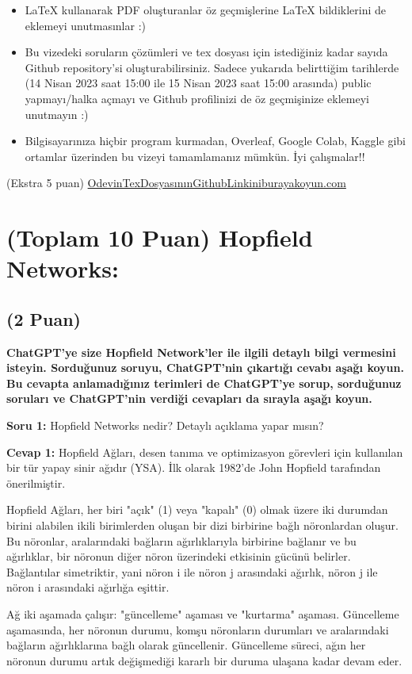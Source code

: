 \documentclass[11pt]{article}
\begin{document}
\begin{itemize}
    \item LaTeX kullanarak PDF oluşturanlar öz geçmişlerine LaTeX bildiklerini de eklemeyi unutmasınlar :)
    \item Bu vizedeki soruların çözümleri ve tex dosyası için istediğiniz kadar sayıda Github repository'si oluşturabilirsiniz. Sadece yukarıda belirttiğim tarihlerde (14 Nisan 2023 saat 15:00 ile 15 Nisan 2023 saat 15:00 arasında) public yapmayı/halka açmayı ve Github profilinizi de öz geçmişinize eklemeyi unutmayın :)
    \item Bilgisayarınıza hiçbir program kurmadan, Overleaf, Google Colab, Kaggle gibi ortamlar üzerinden bu vizeyi tamamlamanız mümkün. İyi çalışmalar!!
\end{itemize}

(Ekstra 5 puan) \url{OdevinTexDosyasınınGithubLinkiniburayakoyun.com}

\newpage
\section{(Toplam 10 Puan) Hopfield Networks:}

\subsection{(2 Puan)} \textbf{ChatGPT’ye size Hopfield Network’ler ile ilgili detaylı bilgi vermesini isteyin. Sorduğunuz soruyu, ChatGPT'nin çıkartığı cevabı aşağı koyun. Bu cevapta anlamadığınız terimleri de ChatGPT’ye sorup, sorduğunuz soruları ve ChatGPT’nin verdiği cevapları da sırayla aşağı koyun.}

\textbf{Soru 1:} Hopfield Networks nedir? Detaylı açıklama yapar mısın?

\textbf{Cevap 1:} Hopfield Ağları, desen tanıma ve optimizasyon görevleri için kullanılan bir tür yapay sinir ağıdır (YSA). İlk olarak 1982'de John Hopfield tarafından önerilmiştir.

Hopfield Ağları, her biri "açık" (1) veya "kapalı" (0) olmak üzere iki durumdan birini alabilen ikili birimlerden oluşan bir dizi birbirine bağlı nöronlardan oluşur. Bu nöronlar, aralarındaki bağların ağırlıklarıyla birbirine bağlanır ve bu ağırlıklar, bir nöronun diğer nöron üzerindeki etkisinin gücünü belirler. Bağlantılar simetriktir, yani nöron i ile nöron j arasındaki ağırlık, nöron j ile nöron i arasındaki ağırlığa eşittir.

Ağ iki aşamada çalışır: "güncelleme" aşaması ve "kurtarma" aşaması. Güncelleme aşamasında, her nöronun durumu, komşu nöronların durumları ve aralarındaki bağların ağırlıklarına bağlı olarak güncellenir. Güncelleme süreci, ağın her nöronun durumu artık değişmediği kararlı bir duruma ulaşana kadar devam eder.
\end{document}

